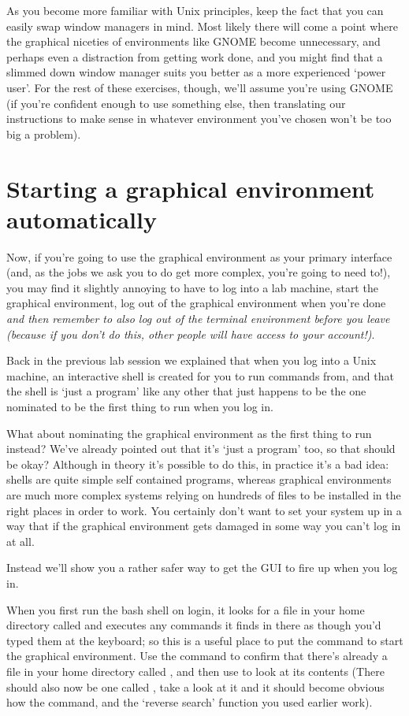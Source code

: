 
As you become more familiar with Unix principles, keep the fact that you can easily swap window managers in mind. Most likely there will come a point where the graphical niceties of environments like GNOME become unnecessary, and perhaps even a distraction from getting work done, and you might find that a slimmed down window manager suits you better as a more experienced `power user'. For the rest of these exercises, though, we'll assume you're using GNOME (if you're confident enough to use something else, then translating our instructions to make sense in whatever environment you've chosen won't be too big a problem). 


\section{Starting a graphical environment automatically}

Now, if you're going to use the graphical environment as your primary interface (and, as the jobs we ask you to do get more complex, you're going to need to!), you may find it slightly annoying to have to log into a lab machine, start the graphical environment, log out of the graphical environment when you're done \textit{and then remember to also log out of the terminal environment before you leave (because if you don't do this, other people will have access to your account!)}. 

Back in the previous lab session we explained that when you log into a Unix machine, an interactive shell is created for you to run commands from, and that the shell is `just a program' like any other that just happens to be the one nominated to be the first thing to run when you log in. 

What about nominating the graphical environment as the first thing to run instead? We've already pointed out that it's `just a program' too, so that should be okay? Although in theory it's possible to do this, in practice it's a bad idea: shells are quite simple self contained programs, whereas graphical environments are much more complex systems relying on hundreds of files to be installed in the right places in order to work. You certainly don't want to set your system up in a way that if the graphical environment gets damaged in some way you can't log in at all. 

Instead we'll show you a rather safer way to get the GUI to fire up when you log in.

When you first run the bash shell on login, it looks for a file in your home directory called  and executes any commands it finds in there as though you'd typed them at the keyboard; so this is a useful place to put the command to start the graphical environment. Use the  command to confirm that there's already a file in your home directory called , and then use  to look at its contents (There should also now be one called , take a look at it and it should become obvious how the  command, and the `reverse search' function you used earlier work).

